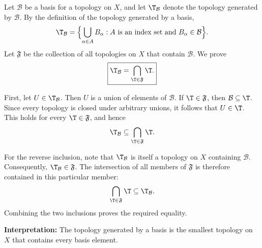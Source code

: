 
Let $\mathcal{B}$ be a basis for a topology on $X$, and let $\T_{\mathcal{B}}$ denote the
topology generated by $\mathcal{B}$. By the definition of the topology generated by a basis,
\[ \T_{\mathcal{B}}=\Bigl\{\bigcup_{\alpha\in A}B_\alpha : A \text{ is an index set and }
   B_\alpha\in\mathcal{B}\Bigr\}. \]
Let $\mathfrak{F}$ be the collection of all topologies on $X$ that contain $\mathcal{B}$. We prove
\[ \boxed{\T_{\mathcal{B}}=\bigcap_{\T\in\mathfrak{F}}\T.} \]

First, let $U\in\T_{\mathcal{B}}$. Then $U$ is a union of elements of $\mathcal{B}$. If
$\T\in\mathfrak{F}$, then $\mathcal{B}\subseteq\T$. Since every topology is closed under
arbitrary unions, it follows that $U\in\T$. This holds for every $\T\in\mathfrak{F}$, and hence
\[ \T_{\mathcal{B}}\subseteq\bigcap_{\T\in\mathfrak{F}}\T. \]

For the reverse inclusion, note that $\T_{\mathcal{B}}$ is itself a topology on $X$ containing
$\mathcal{B}$. Consequently, $\T_{\mathcal{B}}\in\mathfrak{F}$. The intersection of all members
of $\mathfrak{F}$ is therefore contained in this particular member:
\[ \bigcap_{\T\in\mathfrak{F}}\T\subseteq\T_{\mathcal{B}}. \]
Combining the two inclusions proves the required equality.

\textbf{Interpretation:} The topology generated by a basis is the smallest topology on $X$ that
contains every basis element.
